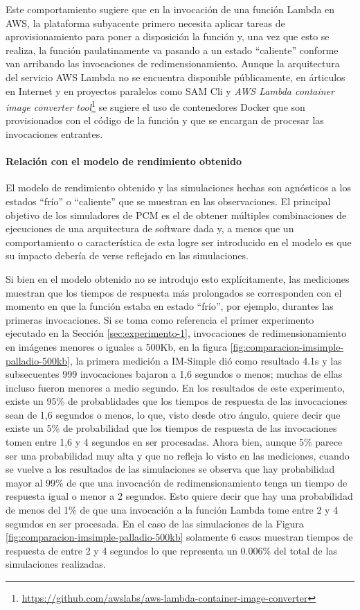 Este comportamiento sugiere que en la invocación de una función Lambda en AWS, la plataforma subyacente primero necesita aplicar tareas de aprovisionamiento para poner a disposición la función y, una vez que esto se realiza, la función paulatinamente va pasando a un estado ``caliente'' conforme van arribando las invocaciones de redimensionamiento. Aunque la arquitectura del servicio AWS Lambda no se encuentra disponible públicamente, en árticulos en Internet y en proyectos paralelos como SAM Cli y \emph{AWS Lambda container image converter tool}\footnote{\url{https://github.com/awslabs/aws-lambda-container-image-converter}} se sugiere el uso de contenedores Docker que son provisionados con el código de la función y que se encargan de procesar las invocaciones entrantes. 

\paragraph{Relación con el modelo de rendimiento obtenido} El modelo de rendimiento obtenido y las simulaciones hechas son agnósticos a los estados ``frío'' o ``caliente'' que se muestran en las observaciones. El principal objetivo de los simuladores de PCM es el de obtener múltiples combinaciones de ejecuciones de una arquitectura de software dada y, a menos que un comportamiento o característica de esta logre ser introducido en el modelo es que su impacto debería de verse reflejado en las simulaciones.

Si bien en el modelo obtenido no se introdujo esto explícitamente, las mediciones muestran que los tiempos de respuesta más prolongados se corresponden con el momento en que la función estaba en estado ``frío'', por ejemplo, durantes las primeras invocaciones. Si se toma como referencia el primer experimento ejecutado en la Sección \ref{sec:experimento-1}, invocaciones de redimensionamiento en imágenes menores o iguales a 500Kb, en la figura \ref{fig:comparacion-imsimple-palladio-500kb}, la primera medición a IM-Simple dió como resultado 4.1s y las subsecuentes 999 invocaciones bajaron a 1,6 segundos o menos; muchas de ellas incluso fueron menores a medio segundo. En los resultados de este experimento, existe un 95\% de probablidades que los tiempos de respuesta de las invocaciones sean de 1,6 segundos o menos, lo que, visto desde otro ángulo, quiere decir que existe un 5\% de probabilidad que los tiempos de respuesta de las  invocaciones tomen entre 1,6 y 4 segundos en ser procesadas. Ahora bien, aunque 5\% parece ser una probabilidad muy alta y que no refleja lo visto en las mediciones, cuando se vuelve a los resultados de las simulaciones se observa que hay probabilidad mayor al 99\% de que una invocación de redimensionamiento tenga un tiempo de respuesta igual o menor a 2 segundos. Esto quiere decir que hay una probabilidad de menos del 1\% de que una invocación a la función Lambda tome entre 2 y 4 segundos en ser procesada. En el caso de las simulaciones de la Figura \ref{fig:comparacion-imsimple-palladio-500kb} solamente 6 casos muestran tiempos de respuesta de entre 2 y 4 segundos lo que representa un 0.006\% del total de las simulaciones realizadas.


